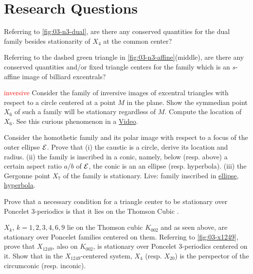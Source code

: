 \section{Research Questions}

\begin{question}
Referring to \cref{fig:03-n3-dual}, are there any conserved quantities for the dual family besides stationarity of $X_4$ at the common center?
\end{question}

\begin{question}
Referring to  the dashed green triangle in \cref{fig:03-n3-affine}(middle), are there any conserved quantities and/or fixed triangle centers for the family which is an $s$-affine image of billiard excentrals?
\end{question}

\begin{question}
\textcolor{red}{inversive}
Consider the family of inversive images of excentral triangles with respect to a circle centered at a point $M$ in the plane. Show the symmedian point $X_6$ of such a family will be stationary regardless of $M$. Compute the location of $X_6$. See this curious phenomenon in a \href{https://youtu.be/wwX_QfkjVi0}{Video}.
\end{question}

\begin{question}
Consider the homothetic family and its polar image with respect to a focus of the outer ellipse $\mathcal{E}$. Prove that (i) the caustic is a circle, derive its location and radius. (ii) the family is inscribed in a conic, namely, below (resp. above) a certain aspect ratio $a/b$ of $\mathcal{E}$, the conic is an an ellipse (resp. hyperbola). (iii) the Gergonne point $X_7$ of the family is stationary.
Live: family inscribed in \href{https://bit.ly/33p7xj6}{ellipse}, \href{https://bit.ly/3bbTaTt}{hyperbola}.
\end{question}

\begin{question}
Prove that a necessary condition for a triangle center to be stationary over Poncelet 3-periodics is that it lies on the Thomson Cubic \cite{gibert2021-thomson}. 
\end{question}

\begin{question}
$X_k$, $k=1,2,3,4,6,9$ lie on the Thomson cubic $K_{002}$ and as seen above, are stationary over Poncelet families centered on them. Referring to \cref{fig:03-x1249}, prove that $X_{1249}$, also on $K_{002}$, is stationary over Poncelet 3-periodics centered on it. Show that in the $X_{1249}$-centered system, $X_4$ (resp. $X_{20}$) is the perspector of the circumconic (resp. inconic). 
\label{que:03-x1249}
\end{question}

